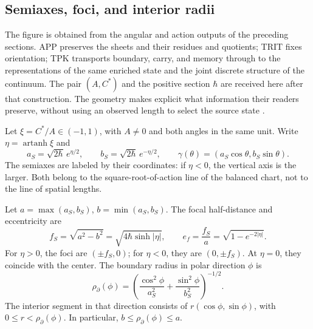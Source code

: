 
\subsection{Semiaxes, foci, and interior radii}
\label{sec:ii-elipse-geometria}

The figure is obtained from the angular and action outputs of the preceding
sections. APP preserves the sheets and their residues and quotients; TRIT fixes
orientation; TPK transports boundary, carry, and memory through to the
representations of the same enriched state and the joint discrete
structure of the continuum. The pair \((A,C^*)\) and the positive section
\(\hbar\) are received here after that construction. The geometry makes explicit
what information their readers preserve, without using an observed length
to select the source state \cite{elipse,hmtedicionintegral}.

Let \(\xi=C^*/A\in(-1,1)\), with \(A\ne0\) and both angles in the
same unit. Write \(\eta=\operatorname{artanh}\xi\) and
\[
 a_S=\sqrt{2\hbar}\,e^{\eta/2},\qquad
 b_S=\sqrt{2\hbar}\,e^{-\eta/2},\qquad
 \gamma(\theta)=(a_S\cos\theta,b_S\sin\theta).
\]
The semiaxes are labeled by their coordinates: if \(\eta<0\),
the vertical axis is the larger. Both belong to the square-root-of-action
line of the balanced chart, not to the line of spatial lengths.

\begin{proposition}
\label{prop:ii-elipse-focos}
Let \(a=\max(a_S,b_S)\), \(b=\min(a_S,b_S)\). The focal half-distance
and eccentricity are
\begin{equation}
 f_S=\sqrt{a^2-b^2}
 =\sqrt{4\hbar\sinh|\eta|},\qquad
 e_f=\frac{f_S}{a}=\sqrt{1-e^{-2|\eta|}}.
 \label{eq:ii-elipse-focal}
\end{equation}
For \(\eta>0\), the foci are \((\pm f_S,0)\); for
\(\eta<0\), they are \((0,\pm f_S)\). At \(\eta=0\), they coincide with
the center. The boundary radius in polar direction \(\phi\) is
\begin{equation}
 \rho_{\partial}(\phi)
 =\left(\frac{\cos^2\phi}{a_S^2}
        +\frac{\sin^2\phi}{b_S^2}\right)^{-1/2}.
 \label{eq:ii-elipse-radio-polar}
\end{equation}
The interior segment in that direction consists of
\(r(\cos\phi,\sin\phi)\), with \(0\le r<\rho_{\partial}(\phi)\).
In particular, \(b\le\rho_{\partial}(\phi)\le a\).
\end{proposition}

